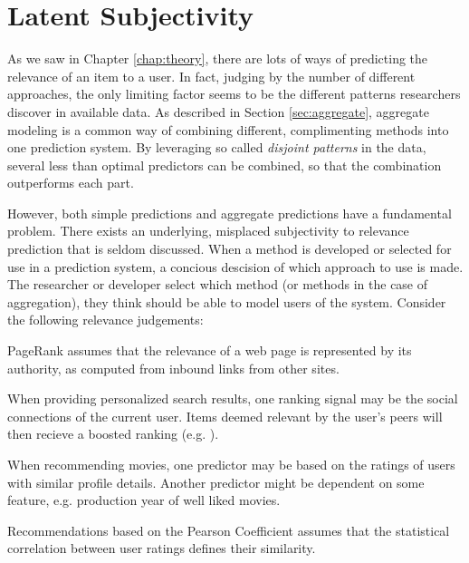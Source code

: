 \section{Latent Subjectivity}
\label{sec:reasoning}

As we saw in Chapter \ref{chap:theory}, 
there are lots of ways of predicting the
relevance of an item to a user. 
In fact, judging by the number of different approaches,
the only limiting factor seems to be the different 
patterns researchers discover in available data.
As described in Section \ref{sec:aggregate},
aggregate modeling is a common way of combining different, complimenting
methods into one prediction system.
By leveraging so called \emph{disjoint patterns}
in the data, several less than optimal predictors
can be combined, so that the combination outperforms each part.

However, both simple predictions and aggregate predictions have a fundamental problem.
There exists an underlying, misplaced subjectivity to relevance prediction that is seldom discussed.
When a method is developed or selected for use in a prediction system,
a concious descision of which approach to use is made.
The researcher or developer select which method (or methods in the case of aggregation),
they think should be able to model users of the system.
Consider the following relevance judgements:

\begin{itemize*}
  \item PageRank \citep{Bender2005} assumes that the relevance of a web page is 
  represented by its authority, as computed from inbound links from other sites.
  \item When providing personalized search results, one ranking signal may be 
  the social connections of the current user. Items deemed relevant by the user's 
  peers will then recieve a boosted ranking (e.g. \cite{Carmel2009}).
  \item When recommending movies, one predictor may be based on the ratings
  of users with similar profile details. Another predictor might be 
  dependent on some feature, e.g. production year of well liked movies.
  \item Recommendations based on the Pearson Coefficient \cite[p11]{Segaran2007}
  assumes that the statistical correlation between user ratings defines their 
  similarity.
\end{itemize*}

